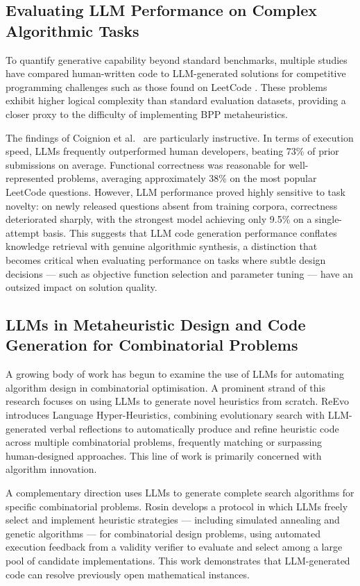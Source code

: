 \documentclass[11pt]{article}
\begin{document}
\subsection{Evaluating LLM Performance on Complex Algorithmic Tasks}

To quantify generative capability beyond standard benchmarks, multiple 
studies have compared human-written code to LLM-generated solutions for 
competitive programming challenges such as those found on LeetCode 
\cite{bubeck, wang, coignion}. These problems exhibit higher logical 
complexity than standard evaluation datasets, providing a closer proxy to 
the difficulty of implementing BPP metaheuristics.

The findings of Coignion et al.\ \cite{coignion} are particularly 
instructive. In terms of execution speed, LLMs frequently outperformed human 
developers, beating 73\% of prior submissions on average. Functional 
correctness was reasonable for well-represented problems, averaging 
approximately 38\% on the most popular LeetCode questions. However, LLM 
performance proved highly sensitive to task novelty: on newly released 
questions absent from training corpora, correctness deteriorated sharply, 
with the strongest model achieving only 9.5\% on a single-attempt basis. 
This suggests that LLM code generation performance conflates knowledge 
retrieval with genuine algorithmic synthesis, a distinction that becomes 
critical when evaluating performance on tasks where subtle design 
decisions --- such as objective function selection and parameter tuning 
--- have an outsized impact on solution quality.

\subsection{LLMs in Metaheuristic Design and Code Generation for Combinatorial Problems}

A growing body of work has begun to examine the use of LLMs for 
automating algorithm design in combinatorial optimisation. A prominent 
strand of this research focuses on using LLMs to generate novel heuristics 
from scratch. ReEvo \cite{reevo} introduces Language Hyper-Heuristics, 
combining evolutionary search with LLM-generated verbal reflections to 
automatically produce and refine heuristic code across multiple 
combinatorial problems, frequently matching or surpassing human-designed 
approaches. This line of work is primarily concerned with algorithm 
innovation.

A complementary direction uses LLMs to generate complete search algorithms 
for specific combinatorial problems. Rosin \cite{rosin2025} develops a 
protocol in which LLMs freely select and implement heuristic strategies --- 
including simulated annealing and genetic algorithms --- for combinatorial 
design problems, using automated execution feedback from a validity 
verifier to evaluate and select among a large pool of candidate 
implementations. This work demonstrates that LLM-generated code can 
resolve previously open mathematical instances.
\end{document}

